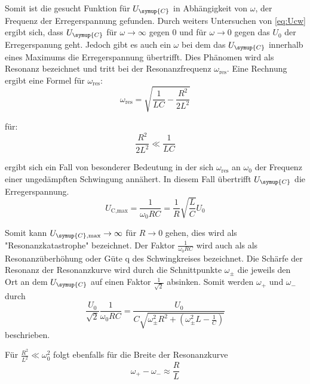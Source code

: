     \noindent Somit ist die gesucht Funktion für $U_{\symup{C}}$ in Abhängigkeit von $\omega$, der Frequenz der Erregerspannung gefunden. Durch 
    weiters Untersuchen von \ref{eq:Ucw} ergibt sich, dass $U_{\symup{C}}$ für $\omega \to \infty $ gegen 0 und für $\omega \to 0$ gegen 
    das $U_0$ der Erregerspanung geht. Jedoch gibt es auch ein $\omega$ bei dem das $U_{\symup{C}}$ innerhalb eines Maximums die 
    Erregerspannung übertrifft. Dies Phänomen wird als Resonanz bezeichnet und tritt bei der Resonanzfrequenz $\omega_{\text{res}}$. 
    Eine Rechnung ergibt eine Formel für $\omega_{\text{res}}$:
    \begin{equation}
        \omega_{\text{res}} = \sqrt{\frac{1}{LC}-\frac{R^2}{2L^2}} \nonumber
    \end{equation}

    für: 
    \begin{equation}
        \frac{R^2}{2L^2} \ll \frac{1}{LC} \nonumber
    \end{equation}

    \noindent ergibt sich ein Fall von besonderer Bedeutung in der sich $\omega_{\text{res}}$ an $\omega_0$ der Frequenz einer ungedämpften 
    Schwingung annähert. In diesem Fall übertrifft $U_{\symup{C}}$ die Erregerspannung.
    \begin{equation}
        U_{\text{C,max}} = \frac{1}{\omega_0 RC} = \frac{1}{R} \sqrt{\frac{L}{C}} U_0 \nonumber
    \end{equation}

    \noindent Somit kann $U_{\symup{C},\text{max}} \to \infty$ für $R \to 0$ gehen, dies wird als "Resonanzkatastrophe" bezeichnet. Der Faktor
    $\frac{1}{\omega_0 RC}$ wird auch als als Resonanzüberhöhung oder Güte q des Schwingkreises bezeichnet. Die Schärfe der Resonanz 
    der Resonanzkurve wird durch die Schnittpunkte $\omega_{\pm}$ die jeweils den Ort an dem $U_{\symup{C}}$ auf einen Faktor $\frac{1}{\sqrt{2}}$ 
    absinken. Somit werden $\omega_+$ und $\omega_-$ durch 
    \begin{equation}
        \frac{U_0}{\sqrt{2}} \frac{1}{\omega_0 RC} = \frac{U_0}{C \sqrt{\omega^2_{\pm} R^2 + \left( \omega^2_{\pm}L - \frac{1}{C} \right) }} \nonumber
    \end{equation}
    beschrieben.

    \noindent Für $\frac{R^2}{L^2} \ll {\omega}^2_0$ folgt ebenfalls für die Breite der Resonanzkurve
    \begin{equation}
        \omega_+ - \omega_- \approx \frac{R}{L} 
        \label{eq:v1}
    \end{equation}

